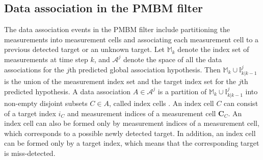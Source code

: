 

\subsection{Data association in the PMBM filter}
The data association events in the PMBM filter include partitioning the measurements into measurement cells and associating each measurement cell to a previous detected target or an unknown target. Let $\mathbb{M}_k$ denote the index set of measurements at time step $k$, and $\mathcal{A}^j$ denote the space of all the data associations for the $j$th predicted global association hypothesis. Then $\mathbb{M}_k\cup\mathbb{I}^j_{k|k-1}$ is the union of the measurement index set and the target index set for the $j$th predicted hypothesis. A data association $A\in\mathcal{A}^j$ is a partition of $\mathbb{M}_k\cup\mathbb{I}^j_{k|k-1}$ into non-empty disjoint subsets $C\in A$, called index cells \cite{pmbmextended2}. An index cell $C$ can consist of a target index $i_C$ and measurement indices of a measurement cell $\mathbf{C}_C$. An index cell can also be formed only by measurement indices of a measurement cell, which corresponds to a possible newly detected target. In addition, an index cell can be formed only by a target index, which means that the corresponding target is miss-detected. 

